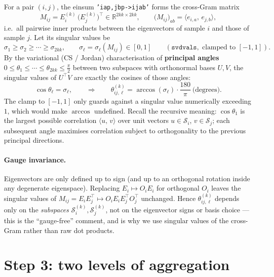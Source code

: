 \documentclass[11pt]{article}
\newcommand{\R}{\mathbb{R}}
\newcommand{\Sub}[1]{\mathcal{S}_{#1}}
\newcommand{\inner}[2]{\langle #1,\, #2\rangle}
\begin{document}
For a pair $(i,j)$, the einsum \texttt{'iap,jbp->ijab'} forms the cross-Gram matrix
\begin{equation}
  M_{ij}=E_i^{(k)}\,\bigl(E_j^{(k)}\bigr)^{\top}\in\R^{2kk\times 2kk},
  \qquad
  \bigl(M_{ij}\bigr)_{ab}=\inner{e_{i,a}}{e_{j,b}},
\end{equation}
i.e.\ all pairwise inner products between the eigenvectors of sample $i$ and those of
sample $j$. Let its singular values be
\begin{equation}
  \sigma_1\ge\sigma_2\ge\cdots\ge\sigma_{2kk}, \qquad
  \sigma_\ell=\sigma_\ell(M_{ij})\in[0,1]
  \qquad(\texttt{svdvals}, \text{ clamped to } [-1,1]).
\end{equation}
By the variational (CS / Jordan) characterisation of \textbf{principal angles}
$0\le\theta_1\le\cdots\le\theta_{2kk}\le \tfrac{\pi}{2}$ between two subspaces with
orthonormal bases $U,V$, the singular values of $U^{\top}V$ are exactly the cosines of
those angles:
\begin{equation}
  \cos\theta_\ell=\sigma_\ell,
  \qquad\Longrightarrow\qquad
  \theta^{(k)}_{ij,\ell}=\arccos(\sigma_\ell)\cdot\frac{180}{\pi}\ \text{(degrees)}.
\end{equation}
The clamp to $[-1,1]$ only guards against a singular value numerically exceeding $1$,
which would make $\arccos$ undefined. Recall the recursive meaning: $\cos\theta_1$ is
the largest possible correlation $\inner{u}{v}$ over unit vectors $u\in\Sub{i}$,
$v\in\Sub{j}$; each subsequent angle maximises correlation subject to orthogonality to
the previous principal directions.

\paragraph{Gauge invariance.} Eigenvectors are only defined up to sign (and up to an
orthogonal rotation inside any degenerate eigenspace). Replacing $E_i\mapsto O_i E_i$
for orthogonal $O_i$ leaves the singular values of
$M_{ij}=E_iE_j^{\top}\mapsto O_iE_iE_j^{\top}O_j^{\top}$ unchanged. Hence
$\theta^{(k)}_{ij,\ell}$ depends only on the \emph{subspaces}
$\Sub{i}^{(k)},\Sub{j}^{(k)}$, not on the eigenvector signs or basis choice --- this
is the ``gauge-free'' comment, and is why we use singular values of the cross-Gram
rather than raw dot products.

\section{Step 3: two levels of aggregation}
\end{document}
